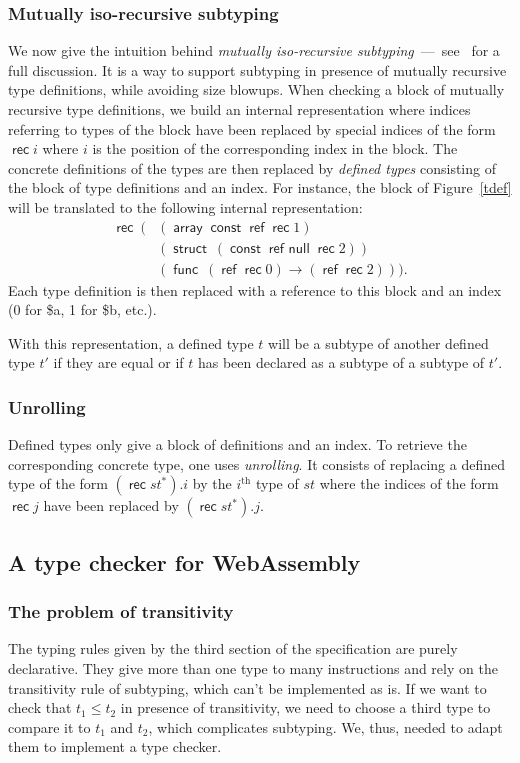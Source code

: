 \documentclass[a4paper,11pt]{article}
\DeclareMathOperator{\reft}{\textsf{ref}}
\DeclareMathOperator{\rect}{\textsf{rec}}
\DeclareMathOperator{\strt}{\textsf{struct}}
\DeclareMathOperator{\arrt}{\textsf{array}}
\DeclareMathOperator{\funt}{\textsf{func}}
\DeclareMathOperator{\cstt}{\textsf{const}}
\DeclareMathOperator{\refnullt}{\textsf{ref null}}
\begin{document}
\subsubsection{Mutually iso-recursive subtyping}\label{deft}
We now give the intuition behind \emph{mutually iso-recursive
subtyping}~---~see~\cite{rossberg2023mutually} for a full discussion. It is a
way to support subtyping in presence of mutually recursive type definitions,
while avoiding size blowups. When checking a block of mutually recursive type
definitions, we build an internal representation where indices referring to
types of the block have been replaced by special indices of the form $\rect i$
where $i$ is the position of the corresponding index in the block. The concrete
definitions of the types are then replaced by \emph{defined types} consisting of
the block of type definitions and an index. For instance, the block of
Figure~\ref{tdef} will be translated to the following internal representation:
\begin{align*}
\rect\ (& (\arrt \cstt\reft \rect 1)\\
&(\strt\ (\cstt \refnullt \rect 2))\\
&(\funt\ (\reft \rect 0)\to (\reft \rect 2))).
\end{align*}
Each type definition is then replaced with a reference to this block and an
index (0 for \textsf{\$a}, 1 for \textsf{\$b}, etc.).

With this representation, a defined type $t$ will be a subtype of another
defined type $t'$ if they are equal or if $t$ has been declared as a subtype of
a subtype of $t'$.

\subsubsection{Unrolling}
Defined types only give a block of definitions and an index. To retrieve the
corresponding concrete type, one uses \emph{unrolling}. It consists of replacing
a defined type of the form $(\rect st^*).i$ by the $i^{\text{th}}$ type of $st$
where the indices of the form $\rect j$ have been replaced by $(\rect st^*).j$.

\subsection{A type checker for WebAssembly}
\subsubsection{The problem of transitivity}
The typing rules given by the third section of the specification are purely
declarative. They give more than one type to many instructions and rely on the
transitivity rule of subtyping, which can't be implemented as is. If we want to
check that $t_1 \leq t_2$ in presence of transitivity, we need to choose a third
type to compare it to $t_1$ and $t_2$, which complicates subtyping. We, thus,
needed to adapt them to implement a type checker.
\end{document}
